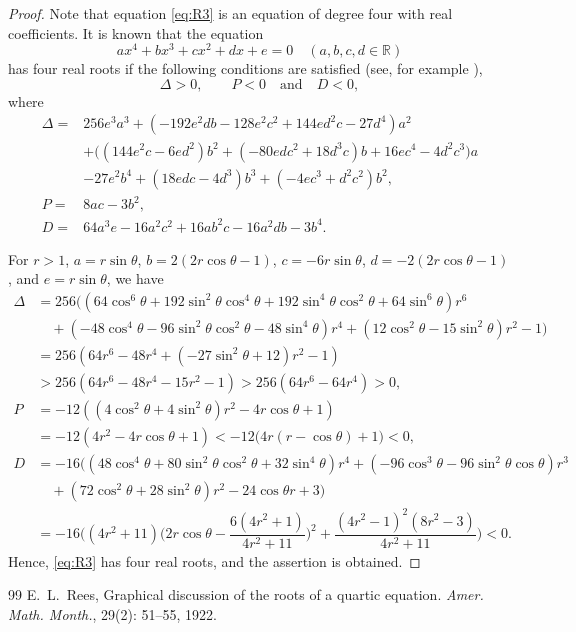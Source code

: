 \documentclass[10pt,a4paper]{amsart}
\begin{document}
\begin{proof}
Note that equation \eqref{eq:R3} is an equation of degree four 
with real coefficients. 
It is known that the equation 
$$  ax^4 + bx^3 + cx^2 + dx + e = 0 \quad (a,b,c,d\in\mathbb{R}) $$
has four real roots if the following conditions are satisfied
(see, for example \cite{Rees}),
$$  \Delta>0,\qquad P<0 \quad\mbox{and}\quad D<0, $$ 
where
\begin{align*}
  \Delta=&
    256e^3a^3+(-192e^2db-128e^2c^2+144ed^2c-27d^4)a^2 \\
    & +\big((144e^2c-6ed^2)b^2+(-80edc^2+18d^3c)b+16ec^4-4d^2c^3\big)a \\
    & -27e^2b^4+(18edc-4d^3)b^3+(-4ec^3+d^2c^2)b^2,\\
  P=& 8ac-3b^2, \\
  D=& 64a^3e-16a^2c^2+16ab^2c-16a^2db-3b^4.
\end{align*}

For $ r>1 $, $ a=r\sin\theta$, $ b=2(2r\cos \theta -1)$, $ c=-6r\sin \theta$,
$d=-2(2r\cos\theta -1)$, and $ e=r\sin\theta$, we have
\begin{align*}
  \Delta & =  256((64\cos^6\theta+192\sin^2\theta\cos^4\theta
          +192\sin^4\theta\cos^2\theta+64\sin^6\theta)r^6\\
      & \quad +(-48\cos^4\theta-96\sin^2\theta\cos^2\theta-48\sin^4\theta)r^4
         +(12\cos^2\theta-15\sin^2\theta)r^2-1)\\
      & = 256(64r^6-48r^4+(-27\sin^2\theta+12)r^2-1)\\
      & >  256(64r^6-48r^4-15r^2-1)>256(64r^6-64r^4)>0, \\
  P   & = -12((4\cos^2\theta+4\sin^2\theta)r^2-4r\cos \theta +1)\\
      & =-12(4r^2-4r\cos \theta +1)
          <-12\big(4r(r-\cos\theta)+1\big)<0,\\
  D   & =-16((48\cos^4\theta+80\sin^2\theta\cos^2\theta+32\sin^4\theta)r^4
        +(-96\cos^3\theta-96\sin^2\theta\cos \theta)r^3 \\
      &\quad  +(72\cos^2\theta+28\sin^2\theta)r^2-24\cos \theta r+3)\\
      & = -16\bigg((4r^2+11)\Big(2r\cos \theta-\dfrac{6(4r^2+1)}{4r^2+11}\Big)^2
             +\dfrac{(4r^2-1)^2(8r^2-3)}{4r^2+11}\bigg) <0.
\end{align*}
Hence, \eqref{eq:R3} has four real roots, and the assertion is obtained.
\end{proof}

\begin{thebibliography}{99}
 {\sc E.~L.~Rees,} {Graphical discussion of the roots of a quartic equation}. {\em {Amer. Math. Month.}}, 29(2): 51--55, 1922. %
\end{thebibliography}
\end{document}

